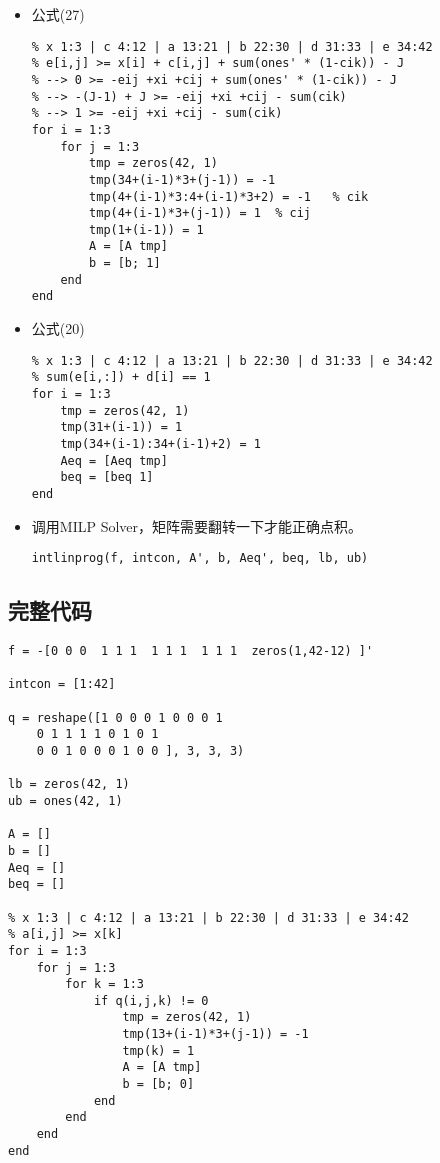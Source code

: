 \documentclass[onecolumn,times]{article}
\begin{document}
\begin{CJK}{UTF8}{gkai}
\begin{itemize}
\item 公式(27)
\begin{Verbatim}
% x 1:3 | c 4:12 | a 13:21 | b 22:30 | d 31:33 | e 34:42
% e[i,j] >= x[i] + c[i,j] + sum(ones' * (1-cik)) - J
% --> 0 >= -eij +xi +cij + sum(ones' * (1-cik)) - J
% --> -(J-1) + J >= -eij +xi +cij - sum(cik)
% --> 1 >= -eij +xi +cij - sum(cik)
for i = 1:3
	for j = 1:3
		tmp = zeros(42, 1)
		tmp(34+(i-1)*3+(j-1)) = -1
		tmp(4+(i-1)*3:4+(i-1)*3+2) = -1   % cik
		tmp(4+(i-1)*3+(j-1)) = 1  % cij
		tmp(1+(i-1)) = 1
		A = [A tmp]
		b = [b; 1]
	end
end
\end{Verbatim}

\item 公式(20)
\begin{Verbatim}
% x 1:3 | c 4:12 | a 13:21 | b 22:30 | d 31:33 | e 34:42
% sum(e[i,:]) + d[i] == 1
for i = 1:3
	tmp = zeros(42, 1)
	tmp(31+(i-1)) = 1
	tmp(34+(i-1):34+(i-1)+2) = 1
	Aeq = [Aeq tmp]
	beq = [beq 1]
end
\end{Verbatim}

\item 调用MILP Solver，矩阵需要翻转一下才能正确点积。
\begin{Verbatim}
intlinprog(f, intcon, A', b, Aeq', beq, lb, ub)
\end{Verbatim}

\end{itemize}

\subsection{完整代码}

\begin{Verbatim}
f = -[0 0 0  1 1 1  1 1 1  1 1 1  zeros(1,42-12) ]'

intcon = [1:42]

q = reshape([1 0 0 0 1 0 0 0 1
	0 1 1 1 1 0 1 0 1
	0 0 1 0 0 0 1 0 0 ], 3, 3, 3)

lb = zeros(42, 1)
ub = ones(42, 1)

A = []
b = []
Aeq = []
beq = []

% x 1:3 | c 4:12 | a 13:21 | b 22:30 | d 31:33 | e 34:42
% a[i,j] >= x[k]
for i = 1:3
	for j = 1:3
		for k = 1:3
			if q(i,j,k) != 0
				tmp = zeros(42, 1)
				tmp(13+(i-1)*3+(j-1)) = -1
				tmp(k) = 1
				A = [A tmp]
				b = [b; 0]
			end
		end
	end
end


\end{Verbatim}
\end{CJK}
\end{document}
